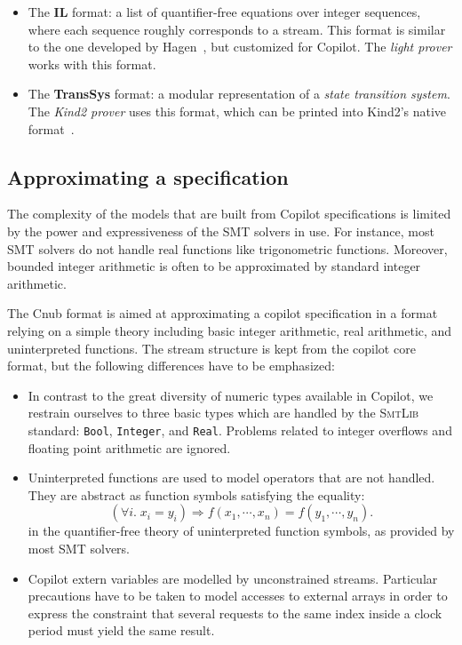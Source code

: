 \begin{itemize}
\item
  The \textbf{IL} format: a list
  of quantifier-free equations over integer sequences, where each sequence
  roughly corresponds to a stream.   This
format is similar to the one developed by Hagen~\cite{HagenPhD}, but customized for Copilot.   The \emph{light prover} works with this
  format.
\item The \textbf{TransSys} format: a modular representation of a
  \emph{state transition system}. The \emph{Kind2 prover} uses this
  format, which can be printed into Kind2's native format~\cite{kind}.
\end{itemize}

\subsection{Approximating a specification}

The complexity of the models that are built from Copilot specifications is
limited by the power and expressiveness of the SMT solvers in use. For instance,
most SMT solvers do not handle real functions like trigonometric functions. Moreover, bounded integer arithmetic is often to be approximated by standard integer arithmetic.

The {Cnub} format is aimed at approximating a copilot specification in a format relying on a simple theory including basic integer arithmetic, real arithmetic, and uninterpreted functions. The stream structure is kept from the copilot core format, but the following differences have to be emphasized:

\begin{itemize}
\item In contrast to the great diversity of numeric types available in Copilot, we restrain ourselves to three basic types which are handled by the \textsc{SmtLib} standard: \texttt{Bool}, \texttt{Integer}, and \texttt{Real}. Problems related to integer overflows and floating point arithmetic are ignored.



\item {Uninterpreted functions} are used to model operators that are not
  handled. They are abstract as function symbols satisfying the
  equality: $$ \left( \forall i . \; x_i = y_i \right) \Longrightarrow f(x_1,
  \cdots, x_n) = f(y_1, \cdots, y_n). $$ in the quantifier-free theory of
  uninterpreted function symbols, as provided by most SMT solvers.

\item Copilot extern variables are modelled by unconstrained streams. Particular precautions have to be taken to model accesses to external arrays in order to express the constraint that several requests to the same index inside a clock period must yield the same result.

\end{itemize}

